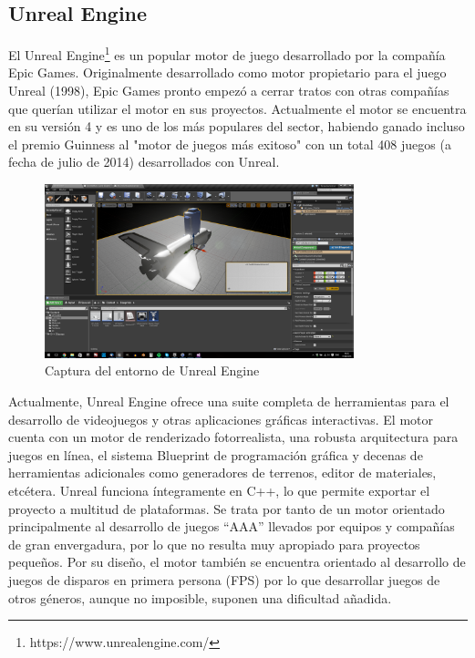 \subsection{Unreal Engine}
El Unreal Engine\footnote{https://www.unrealengine.com/} es un popular motor de juego desarrollado por la compañía Epic Games. Originalmente desarrollado como motor propietario para el juego Unreal (1998), Epic Games pronto empezó a cerrar tratos con otras compañías que querían utilizar el motor en sus proyectos. Actualmente el motor se encuentra en su versión 4 y es uno de los más populares del sector, habiendo ganado incluso el premio Guinness al "motor de juegos más exitoso" con un total 408 juegos (a fecha de julio de 2014) desarrollados con Unreal. 
\begin{figure}[h]
	\includegraphics[width=0.8\textwidth]{images/estadodelarte/motores/captura-unreal}
	\centering
	\caption{Captura del entorno de Unreal Engine}
\end{figure}

Actualmente, Unreal Engine ofrece una suite completa de herramientas para el desarrollo de videojuegos y otras aplicaciones gráficas interactivas. El motor cuenta con un motor de renderizado fotorrealista, una robusta arquitectura para juegos en línea, el sistema Blueprint de programación gráfica y decenas de herramientas adicionales como generadores de terrenos, editor de materiales, etcétera. Unreal funciona íntegramente en C++, lo que permite exportar el proyecto a multitud de plataformas. Se trata por tanto de un motor orientado principalmente al desarrollo de juegos ``AAA'' llevados por equipos y compañías de gran envergadura, por lo que no resulta muy apropiado para proyectos pequeños. Por su diseño, el motor también se encuentra orientado al desarrollo de juegos de disparos en primera persona (FPS) por lo que desarrollar juegos de otros géneros, aunque no imposible, suponen una dificultad añadida.

